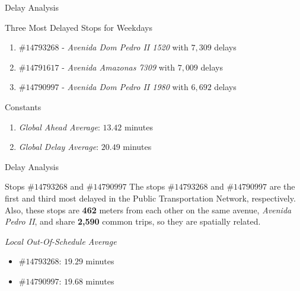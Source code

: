 \documentclass[xcolor=dvipsnames,table]{beamer}
\begin{document}
\begin{frame}{Delay Analysis}
        \begin{block}{Three Most Delayed Stops for Weekdays}
                \begin{enumerate}
                        \item $\#14793268$ - \textit{Avenida Dom Pedro II 1520} with $7,309$ delays 
                        \item $\#14791617$ - \textit{Avenida Amazonas 7309} with $7,009$ delays
                        \item $\#14790997$ - \textit{Avenida Dom Pedro II 1980} with $6,692$ delays 
                \end{enumerate}
        \end{block}
        \begin{block}{Constants} 
                \begin{enumerate}
                        \item \textit{Global Ahead Average}: $13.42$ minutes 
                        \item \textit{Global Delay Average}: $20.49$ minutes 
                \end{enumerate}
        \end{block}
\end{frame}
\begin{frame}{Delay Analysis}
        \begin{block}{Stops $\#14793268$ and $\#14790997$} 
                The stops $\#14793268$ and $\#14790997$ are the first and third most delayed in the Public Transportation Network, respectively.
                Also, these stops are \textbf{462} meters from each other on the same avenue, \textit{Avenida Pedro II}, and share \textbf{2,590} common trips, so they are spatially related.
        \end{block}
        \begin{block}{\textit{Local Out-Of-Schedule Average}} 
                \begin{itemize}
                        \item $\#14793268$: $19.29$ minutes 
                        \item $\#14790997$: $19.68$ minutes 
                \end{itemize}
        \end{block}
\end{frame}
\end{document}
